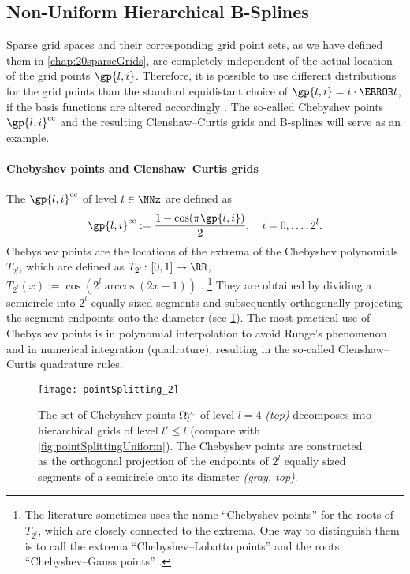 \subsection{Non-Uniform Hierarchical B-Splines}
\label{sec:314nonUniform}

Sparse grid spaces and their corresponding grid point sets,
as we have defined them in \cref{chap:20sparseGrids},
are completely independent of the actual location of the grid points
$\gp{l,i}$.
Therefore, it is possible to use different distributions for the grid points
than the standard equidistant choice of $\gp{l,i} = i \cdot \ms{l}$,
if the basis functions are altered accordingly
\cite{Valentin14Hierarchische}.
The so-called Chebyshev points $\gp{l,i}^\clenshawcurtis$ and the
resulting Clenshaw--Curtis grids and B-splines will serve as an example.

\paragraph{Chebyshev points and Clenshaw--Curtis grids}

%
The  $\gp{l,i}^\clenshawcurtis$ of level $l \in \NNz$
are defined as
\begin{equation}
  \gp{l,i}^\clenshawcurtis
  := \frac{1 - \cos(\pi \gp{l,i})}{2},\quad
  i = 0, \dotsc, 2^l.
\end{equation}
Chebyshev points are the locations of the extrema of the
Chebyshev polynomials $T_{2^l}$, which are defined as
$T_{2^l}\colon [0, 1] \to \RR$,
$T_{2^l}(x) := \cos(2^l \arccos(2x - 1))$ \cite{Xu16Chebyshev}.%
\footnote{%
  The literature sometimes uses the name ``Chebyshev points'' for
  the roots of $T_{2^l}$, which are closely connected to the extrema.
  One way to distinguish them is to call the extrema
  ``Chebyshev--Lobatto points'' and the roots
  ``Chebyshev--Gauss points'' \cite{Xu16Chebyshev}.%
}
They are obtained by dividing a semicircle into $2^l$ equally sized
segments and subsequently orthogonally projecting the
segment endpoints onto the diameter
(see \cref{fig:pointSplittingChebyshev}).
The most practical use of Chebyshev points is in
polynomial interpolation to avoid Runge's phenomenon and in
numerical integration (quadrature), resulting in the
so-called Clenshaw--Curtis quadrature rules.

\begin{figure}
  \texttt{[image: pointSplitting\_2]}%
  \caption{%
    The set of Chebyshev points $\Omega_l^{\mathrm{cc}}$ of level
    $l = 4$ \emph{(top)}
    decomposes into hierarchical grids of level $l' \le l$
    (compare with \cref{fig:pointSplittingUniform}).
    The Chebyshev points are constructed as
    the orthogonal projection of the
    endpoints of $2^l$ equally sized segments
    of a semicircle onto its diameter \emph{\textcolor{C8}{(gray, top)}}.%
  }
  \label{fig:pointSplittingChebyshev}
\end{figure}

